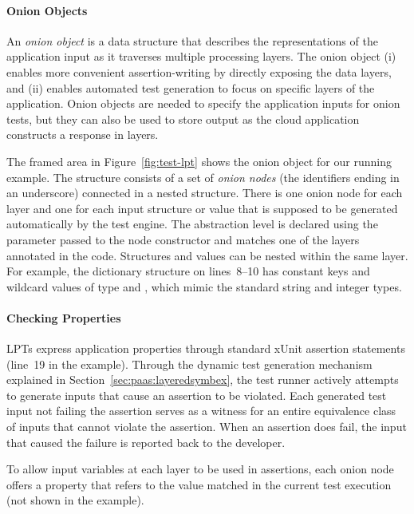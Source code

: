 \paragraph{Onion Objects}

An \emph{onion object} is a data structure that describes the representations of the application input as it traverses multiple processing layers.  The onion object (i) enables more convenient assertion-writing by directly exposing the data layers, and (ii) enables automated test generation to focus on specific layers of the application. Onion objects are needed to specify the application inputs for onion tests, but they can also be used to store output as the cloud application constructs a response in layers.

The framed area in Figure~\ref{fig:test-lpt} shows the onion object for our running example.  The structure consists of a set of \emph{onion nodes} (the identifiers ending in an underscore) connected in a nested structure.  There is one onion node for each layer and one for each input structure or value that is supposed to be generated automatically by the test engine.  The abstraction level is declared using the  parameter passed to the node constructor and matches one of the layers annotated in the code.  Structures and values can be nested within the same layer.  For example, the dictionary structure on lines~8--10 has constant keys and wildcard values of type  and , which mimic the standard string and integer types.

\paragraph{Checking Properties}

LPTs express application properties through standard xUnit assertion statements (line~19 in the example).  Through the dynamic test generation mechanism explained in Section~\ref{sec:paas:layeredsymbex}, the test runner actively attempts to generate inputs that cause an assertion to be violated. Each generated test input not failing the assertion serves as a witness for an entire equivalence class of inputs that cannot violate the assertion.
%
When an assertion does fail, the input that caused the failure is reported back to the developer.

To allow input variables at each layer to be used in assertions, each onion node offers a  property that refers to the value matched in the current test execution (not shown in the example).

